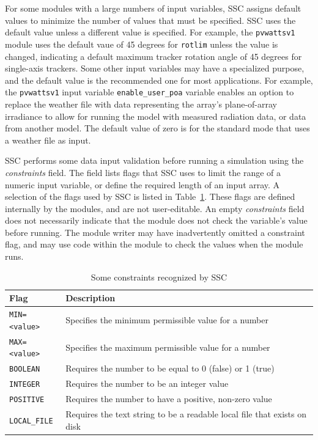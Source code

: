 \documentclass{scrartcl} %
\begin{document}
For some modules with a large numbers of input variables, SSC assigns default values to minimize the number of values that must be specified. SSC uses the default value unless a different value is specified. For example, the \texttt{pvwattsv1} module uses the default vaue of 45 degrees for \texttt{rotlim} unless the value is changed, indicating a default maximum tracker rotation angle of 45 degrees for single-axis trackers. Some other input variables may have a specialized purpose, and the default value is the recommended one for most applications. For example, the \texttt{pvwattsv1} input variable \texttt{enable\_user\_poa} variable enables an option to replace the weather file with data representing the array's plane-of-array irradiance to allow for running the model with measured radiation data, or data from another model. The default value of zero is for the standard mode that uses a weather file as input.

SSC performs some data input validation before running a simulation using the \emph{constraints} field. The field lists flags that SSC uses to limit the range of a numeric input variable, or define the required length of an input array.  A selection of the flags used by SSC is listed in Table~\ref{tab_constraints}.  These flags are defined internally by the modules, and are not user-editable. An empty \emph{constraints} field does not necessarily indicate that the module does not check the variable's value before running. The module writer may have inadvertently omitted a constraint flag, and may use code within the module to check the values when the module runs.

\begin{table}[ht]
\begin{center}
\begin{tabular}{ll}
Flag & Description\\
\hline
\texttt{MIN=<value>} & Specifies the minimum permissible value for a number \\
\texttt{MAX=<value>} & Specifies the maximum permissible value for a number \\
\texttt{BOOLEAN} & Requires the number to be equal to 0 (false) or 1 (true) \\
\texttt{INTEGER} & Requires the number to be an integer value \\
\texttt{POSITIVE} & Requires the number to have a positive, non-zero value \\
\texttt{LOCAL\_FILE} & Requires the text string to be a readable local file that exists on disk \\
\end{tabular}
\caption{Some constraints recognized by SSC}
\label{tab_constraints}
\end{center}
\end{table}
\end{document}
